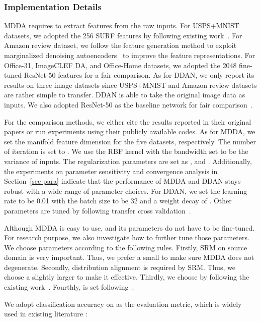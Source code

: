 \documentclass[acmsmall]{acmart}
\begin{document}
\subsubsection{Implementation Details}

MDDA requires to extract features from the raw inputs. For USPS+MNIST datasets, we adopted the 256 SURF features by following existing work~\cite{zhang2017joint,wang2017balanced}. For Amazon review dataset, we follow the feature generation method to exploit marginalized denoising autoencoders~\cite{chen2012marginalized} to improve the feature representations. For Office-31, ImageCLEF DA, and Office-Home datasets, we adopted the 2048 fine-tuned ResNet-50 features for a fair comparison. As for DDAN, we only report its results on three image datasets since USPS+MNIST and Amazon review datasets are rather simple to transfer. DDAN is able to take the original image data as inputs. We also adopted ResNet-50 as the baseline network for fair comparison~\cite{zhang2018collaborative,long2018conditional}.

For the comparison methods, we either cite the results reported in their original papers or run experiments using their publicly available codes. As for MDDA, we set the manifold feature dimension  for the five datasets, respectively. The number of iteration is set to . We use the RBF kernel with the bandwidth set to be the variance of inputs. The regularization parameters are set as , and . Additionally, the experiments on parameter sensitivity and convergence analysis in Section~\ref{sec-para} indicate that the performance of MDDA and DDAN stays robust with a wide range of parameter choices. For DDAN, we set the learning rate to be 0.01 with the batch size to be 32 and a weight decay of . Other parameters are tuned by following transfer cross validation~\cite{zhong2009cross}.

Although MDDA is easy to use, and its parameters do not have to be fine-tuned. For research purpose, we also investigate how to further tune those parameters. We choose parameters according to the following rules. Firstly, SRM on source domain is very important. Thus, we prefer a small  to make sure MDDA does not degenerate. Secondly, distribution alignment is required by SRM. Thus, we choose a slightly larger  to make it effective. Thirdly, we choose  by following the existing work~\cite{belkin2006manifold}. Fourthly,  is set following~\cite{cai2011graph}.

We adopt classification accuracy on  as the evaluation metric, which is widely used in existing literature \cite{pan2011domain,wang2017balanced,gong2012geodesic}:
\end{document}
